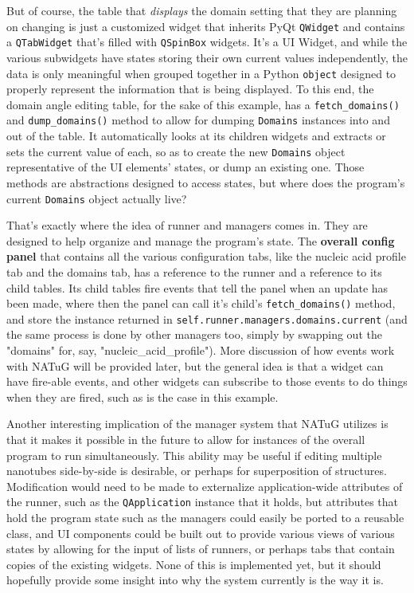 \documentclass[titlepage]{article}
\begin{document}
	But of course, the table that \textit{displays} the domain setting that they are planning on changing is just a customized widget that inherits PyQt \texttt{QWidget} and contains a \texttt{QTabWidget} that's filled with \texttt{QSpinBox} widgets. It's a UI Widget, and while the various subwidgets have states storing their own current values independently, the data is only meaningful when grouped together in a Python \texttt{object} designed to properly represent the information that is being displayed. To this end, the domain angle editing table, for the sake of this example, has a \texttt{fetch\_domains()} and \texttt{dump\_domains()} method to allow for dumping \texttt{Domains} instances into and out of the table. It automatically looks at its children widgets and extracts or sets the current value of each, so as to create the new \texttt{Domains} object representative of the UI elements' states, or dump an existing one. Those methods are abstractions designed to access states, but where does the program's current \texttt{Domains} object actually live? 
	
	That's exactly where the idea of runner and managers comes in. They are designed to help organize and manage the program's state. The \textbf{overall config panel} that contains all the various configuration tabs, like the nucleic acid profile tab and the domains tab, has a reference to the runner and a reference to its child tables. Its child tables fire events that tell the panel when an update has been made, where then the panel can call it's child's \texttt{fetch\_domains()} method, and store the instance returned in \texttt{self.runner.managers.domains.current} (and the same process is done by other managers too, simply by swapping out the "domains" for, say, "nucleic\_acid\_profile"). More discussion of how events work with NATuG will be provided later, but the general idea is that a widget can have fire-able events, and other widgets can subscribe to those events to do things when they are fired, such as is the case in this example.
	
	Another interesting implication of the manager system that NATuG utilizes is that it makes it possible in the future to allow for instances of the overall program to run simultaneously. This ability may be useful if editing multiple nanotubes side-by-side is desirable, or perhaps for superposition of structures. Modification would need to be made to externalize application-wide attributes of the runner, such as the \texttt{QApplication} instance that it holds, but attributes that hold the program state such as the managers could easily be ported to a reusable class, and UI components could be built out to provide various views of various states by allowing for the input of lists of runners, or perhaps tabs that contain copies of the existing widgets. None of this is implemented yet, but it should hopefully provide some insight into why the system currently is the way it is.
	
\end{document}
